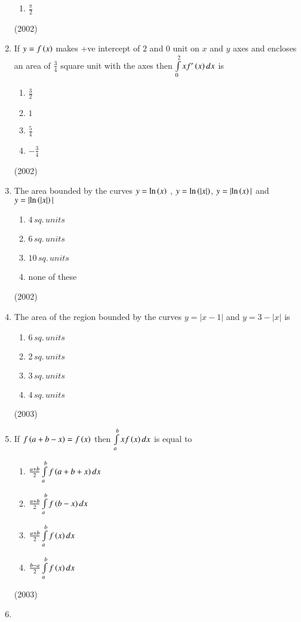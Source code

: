 \documentclass[journal,12pt,twocolumn]{IEEEtran}
\theoremstyle{remark}
\begin{document}
\begin{enumerate}
\begin{enumerate}
					\item $\frac{\pi}{2}$
			\end{enumerate}
			\hfill (2002)
	\item
		If $y=f\left(x\right)$ makes +ve intercept of $2$ and $0$ unit on $x$ and $y$ axes and encloses an area of $\frac{3}{4}$ square unit with the axes then $\int \limits_0^2 x f'\left(x\right)dx$ is
			\begin{enumerate}
				\item $\frac{3}{2}$
				\item $1$
				\item $\frac{5}{4}$
				\item $-\frac{3}{4}$
			\end{enumerate}
			\hfill (2002)
	\item
		The area bounded by the curves $y= \mathrm{ln} \left(x\right)$ , $y= \mathrm{ln} \left(|x|\right)$, $y=|\mathrm{ln}\left(x\right)|$ and $y=| \mathrm{ln} \left(|x|\right)|$
			\begin{enumerate}
					\item $4 \, sq. \, units$
					\item $6 \, sq. \, units$
					\item $10 \, sq. \, units$
					\item none of these
			\end{enumerate}
			\hfill(2002)
	\item
		The area of the region bounded by the curves $y= |x-1|$ and $y=3-|x|$ is
			\begin {enumerate}
				\item $6 \, sq. \, units$
				\item $2 \, sq. \, units$
				\item $3 \, sq. \, units$
				\item $4 \, sq. \, units$
			\end {enumerate}
			\hfill (2003)
	\item
		If $f\left(a+b-x\right)=f\left(x\right)$ then $\int \limits_a^b xf\left(x\right)dx$ is equal to
			\begin {enumerate}
				\item $\frac{a+b}{2} \int \limits_a^b f\left(a+b+x\right)dx$
				\item $\frac{a+b}{2} \int \limits_a^b f\left(b-x\right)dx$
				\item $\frac{a+b}{2} \int \limits_a^b f\left(x\right)dx$
				\item $\frac{b-a}{2} \int \limits_a^b f\left(x\right)dx$
			\end {enumerate}
			\hfill (2003)
	\item 

\end{enumerate}
\end{document}
